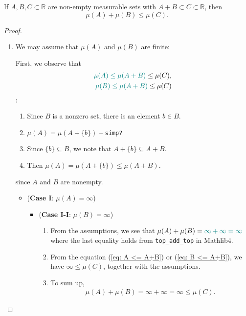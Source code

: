 \begin{lemma}
    If \(A, B, C \subset \mathbb{R}\) are non-empty measurable sets with \(A+B\subset C \subset \mathbb{R}\), then
    \begin{equation*}
        \mu(A) + \mu(B) \leq \mu(C).
    \end{equation*}
\end{lemma}

\begin{proof}
    \begin{enumerate}
        \item We may assume that \(\mu(A)\) and \(\mu(B)\) are finite:
        
        First, we observe that 
        \begin{eqnarray}
            {\color{teal}\mu(A) \leq \mu(A+B)} \leq \mu(C), \label{eq: A <= A+B}\\
            {\color{teal}\mu(B) \leq \mu(A+B)} \leq \mu(C) \label{eq: B <= A+B}
        \end{eqnarray}
        :\begin{enumerate}
            \item Since \(B\) is a nonzero set, there is an element \(b \in B\).
            \item \(\mu(A) =\mu(A+\{b\})\) -- \texttt{simp?}
            \item Since \(\{b\} \subseteq B\), we note that \(A + \{b\} \subseteq A + B\).
            \item Then \(\mu(A) = \mu(A + \{b\}) \leq \mu(A+B)\).
        \end{enumerate}
        since \(A\) and \(B\) are nonempty.
        \begin{itemize}
            \item (\textbf{Case I}: \(\mu(A)=\infty\)) 
            \begin{itemize}
                \item (\textbf{Case I-I}: \(\mu(B) = \infty\))  
                \begin{enumerate}
                    \item From the assumptions, we see that \(\mu(A) + \mu(B) = {\color{teal}\infty + \infty = \infty}\) where the last equality holds from \texttt{top\_add\_top} in Mathlib4. 
                    \item From the equation (\ref{eq: A <= A+B}) or (\ref{eq: B <= A+B}), we have \(\infty \leq \mu(C)\), together with the assumptions.
                    \item To sum up,
                    \begin{eqnarray*}
                        \mu(A) + \mu (B) = \infty + \infty = \infty \leq \mu(C).
                    \end{eqnarray*}
                \end{enumerate}


\end{itemize}
\end{itemize}
\end{enumerate}
\end{proof}

